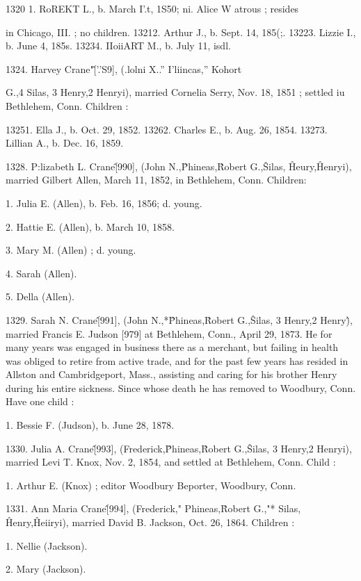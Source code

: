 \documentclass{book}
\begin{document}
1320  1. RoREKT L., b. March I'.t, 1S50; ni. Alice W atrous ; resides 

in Chicago, III. ; no children. 
13212. Arthur J., b. Sept. 14, 185(;. 
13223. Lizzie I., b. June 4, 185s. 
13234. IIoiiART M., b. July 11, isdl. 

1324. Harvey Crane"\^ ['.'S9], (.lolni X..'' I'liincas,'' Kohort 




G.,4 Silas, 3 Henry,2 Henryi), married Cornelia Serry, Nov. 18, 
1851 ; settled iu Bethlehem, Conn. Children : 

13251. Ella J., b. Oct. 29, 1852. 
13262. Charles E., b. Aug. 26, 1854. 
13273. Lillian A., b. Dec. 16, 1859. 

1328. P:lizabeth L. Crane\^ [990], (John N.,\^ Phineas,\^ 
Robert G.,\^ Silas, \^ Heury,\^ Henryi), married Gilbert Allen, 
March 11, 1852, in Bethlehem, Conn. Children: 

1. Julia E. (Allen), b. Feb. 16, 1856; d. young. 

2. Hattie E. (Allen), b. March 10, 1858. 

3. Mary M. (Allen) ; d. young. 

4. Sarah (Allen). 

5. Della (Allen). 

1329. Sarah N. Crane\^ [991], (John N.,*\^ Phineas,\^ Robert 
G.,\^ Silas, 3 Henry,2 Henry\^), married Francis E. Judson [979] 
at Bethlehem, Conn., April 29, 1873. He for many years was 
engaged in business there as a merchant, but failing in health was 
obliged to retire from active trade, and for the past few years 
has resided in Allston and Cambridgeport, Mass., assisting and 
caring for his brother Henry during his entire sickness. Since 
whose death he has removed to Woodbury, Conn. Have one 
child : 

1. Bessie F. (Judson), b. June 28, 1878. 

1330. Julia A. Crane\^ [993], (Frederick,\^ Phineas,\^ Robert 
G.,\^ Silas, 3 Henry,2 Henryi), married Levi T. Knox, Nov. 2, 
1854, and settled at Bethlehem, Conn. Child : 

1. Arthur E. (Knox) ; editor Woodbury Beporter, Woodbury, Conn. 

1331. Ann Maria Crane\^ [994], (Frederick," Phineas,\^ 
Robert G.,"* Silas, \^ Henry,\^ Heiiryi), married David B. Jackson, 
Oct. 26, 1864. Children : 

1. Nellie (Jackson). 

2. Mary (Jackson). 
\end{document}
